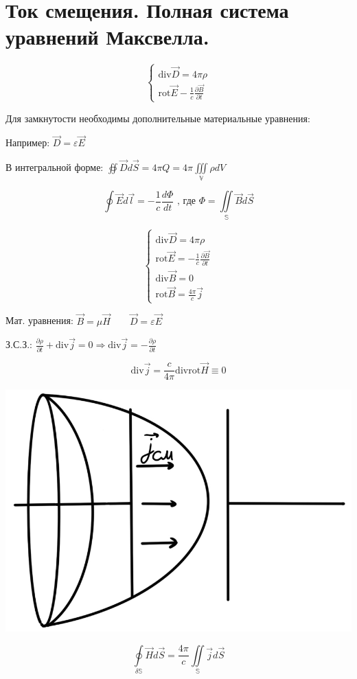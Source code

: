 \section{Ток смещения. Полная система уравнений Максвелла.}

\[
\begin{cases}
    \mathrm{div}\vec{D}=4\pi\rho \\
    \mathrm{rot}\vec{E}-\frac{1}{c} \frac{\partial \vec{B}}{\partial t}    
\end{cases}
\]

Для замкнутости необходимы дополнительные материальные уравнения:

Например: \( \vec{D}=\varepsilon\vec{E} \)

В интегральной форме: \( \oiint \vec{D}d\vec{S}=4\pi Q=4\pi \underset{\mathbb{V} }{\iiint}\rho dV \) 

\[
\oint\vec{E}d\vec{l}=-\frac{1}{c}\frac{d\Phi}{dt}\text{ , где } \Phi=\underset{\mathbb{S} }{\iint}\vec{B}d\vec{S}  
\]

\[
\begin{cases}
    \mathrm{div}\vec{D}=4\pi\rho \\
    \mathrm{rot}\vec{E}=-\frac{1}{c} \frac{\partial \vec{B}}{\partial t} \\
    \mathrm{div}\vec{B}=0 \\
    \mathrm{rot}\vec{B}=\frac{4\pi}{c}\vec{j}      
\end{cases}
\]

Мат. уравнения: \( \vec{B}=\mu\vec{H} \qquad \vec{D}=\varepsilon\vec{E} \)

З.С.З.: \( \frac{\partial\rho}{\partial t} +\mathrm{div}\vec{j}=0\Rightarrow \mathrm{div}\vec{j} =-\frac{\partial\rho}{\partial t}  \) 

\[
\mathrm{div}\vec{j}= \frac{c}{4\pi}\mathrm{div}\mathrm{rot}\vec{H}\equiv     0
\]

\begin{minipage}[c]{0.4\textwidth} %
    \includegraphics[width=\textwidth]{im/88.png}%
\end{minipage}%
\hfill
\begin{minipage}[c]{0.6\textwidth} %
\[\underset{\delta\mathbb{S} }{\oint} \vec{H}d\vec{S}=\frac{4\pi}{c}\underset{\mathbb{S}}{\iint} \vec{j}d\vec{S} \]
\end{minipage}

